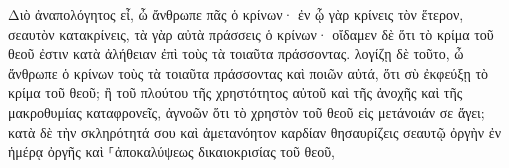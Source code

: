 \documentclass{openreader}
\begin{document}
Διὸ ἀναπολόγητος εἶ, ὦ ἄνθρωπε πᾶς ὁ κρίνων· ἐν ᾧ γὰρ κρίνεις τὸν ἕτερον, σεαυτὸν κατακρίνεις, τὰ γὰρ αὐτὰ πράσσεις ὁ κρίνων· 
οἴδαμεν δὲ ὅτι τὸ κρίμα τοῦ θεοῦ ἐστιν κατὰ ἀλήθειαν ἐπὶ τοὺς τὰ τοιαῦτα πράσσοντας. 
λογίζῃ δὲ τοῦτο, ὦ ἄνθρωπε ὁ κρίνων τοὺς τὰ τοιαῦτα πράσσοντας καὶ ποιῶν αὐτά, ὅτι σὺ ἐκφεύξῃ τὸ κρίμα τοῦ θεοῦ; 
ἢ τοῦ πλούτου τῆς χρηστότητος αὐτοῦ καὶ τῆς ἀνοχῆς καὶ τῆς μακροθυμίας καταφρονεῖς, ἀγνοῶν ὅτι τὸ χρηστὸν τοῦ θεοῦ εἰς μετάνοιάν σε ἄγει; 
κατὰ δὲ τὴν σκληρότητά σου καὶ ἀμετανόητον καρδίαν θησαυρίζεις σεαυτῷ ὀργὴν ἐν ἡμέρᾳ ὀργῆς καὶ ⸀ἀποκαλύψεως δικαιοκρισίας τοῦ θεοῦ, 
\end{document}
